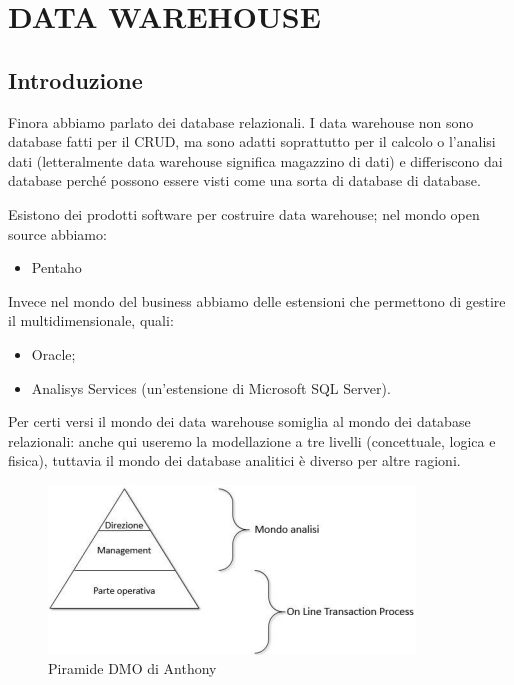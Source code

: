 
\chapter{DATA WAREHOUSE}
\label{cap:dw}


\section{Introduzione}

Finora abbiamo parlato dei database relazionali. I data warehouse non sono database fatti per il 
CRUD, ma sono adatti soprattutto per il calcolo o l’analisi dati (letteralmente data warehouse 
significa magazzino di dati) e differiscono dai database perché possono essere visti come una sorta 
di database di database. 

Esistono dei prodotti software per costruire data warehouse; nel mondo open source abbiamo: 

\begin{itemize}
\item Pentaho 
\end{itemize}

Invece nel mondo del business abbiamo delle estensioni che permettono di gestire il 
multidimensionale, quali: 

\begin{itemize}
\item Oracle;
\item Analisys Services (un’estensione di Microsoft SQL Server). 

\end{itemize}

Per certi versi il mondo dei data warehouse somiglia al mondo dei database relazionali: anche qui useremo la modellazione a tre livelli (concettuale, logica e fisica), tuttavia il mondo dei database analitici è diverso per altre ragioni.

\begin{center}
\begin{figure}[H]
\centering
\includegraphics[scale=1]{figures/dmo2.png}
\caption{Piramide DMO di Anthony}
\end{figure}
\end{center}

